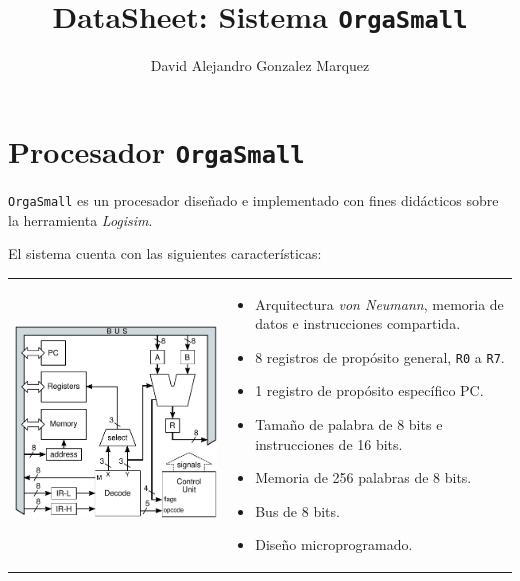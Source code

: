 \documentclass[a4paper,11pt]{article}
\title{DataSheet: Sistema \texttt{OrgaSmall}}
\author{David Alejandro Gonzalez Marquez}
\date{}
\begin{document}
\maketitle

\section*{Procesador \texttt{OrgaSmall}}

\texttt{OrgaSmall} es un procesador diseñado e implementado con fines didácticos sobre la herramienta \emph{Logisim}.

\noindent El sistema cuenta con las siguientes características:

\begin{center}
\begin{tabular}[c]{p{6.5cm}p{8cm}}
\includegraphics[scale=0.7]{img/arquitectura_micro_stack.pdf}
&
\vspace{-5.5cm}
\begin{minipage}{8cm}
\begin{itemize}
  \setlength\itemsep{0em}
 \item Arquitectura \emph{von Neumann}, memoria de datos e instrucciones compartida.
 \item 8 registros de propósito general, \texttt{R0} a \texttt{R7}.
 \item 1 registro de propósito específico PC.
 \item Tamaño de palabra de 8 bits e instrucciones de 16 bits.
 \item Memoria de 256 palabras de 8 bits.
 \item Bus de 8 bits.
 \item Diseño microprogramado.
\end{itemize}
\end{minipage}
\\
\end{tabular}
\end{center}
\end{document}
